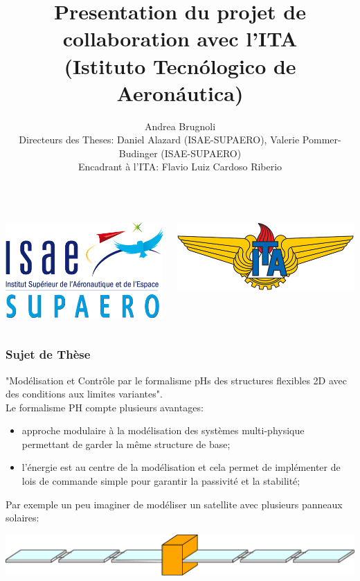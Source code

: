 \documentclass{beamer}
\title[Collaboration avec l'ITA]{Presentation du projet de collaboration avec l'ITA \\ (Istituto Tecn\'ologico de Aeron\'autica)}
\author[A. Brugnoli ISAE-SUPAERO]{\small Andrea Brugnoli \\
 \footnotesize Directeurs des Theses: Daniel Alazard (ISAE-SUPAERO), Valerie Pommer-Budinger (ISAE-SUPAERO) \\
\footnotesize Encadrant à l'ITA: Flavio Luiz Cardoso Riberio}
\begin{document}
	
	
	
\begin{frame}
	\titlepage
\begin{columns}
	\begin{column}{0.5\textwidth}
		\centering
		\includegraphics[height=0.2\textheight]{ISAE-SUPAERO.png}
	\end{column}
	\begin{column}{0.5\textwidth}
		\centering
		\includegraphics[scale=0.3]{ITA_logo.png}
	\end{column}
\end{columns}

\end{frame}

\begin{frame}
\frametitle{Sujet de Thèse}
"Modélisation et Contrôle par le formalisme pHs des structures flexibles 2D avec des conditions aux limites variantes".\\
\vspace{5mm}
Le formalisme PH compte plusieurs avantages:
\begin{itemize}
\item approche modulaire à la modélisation des systèmes multi-physique permettant de garder la même structure de base;
\item l'énergie est au centre de la modélisation et cela permet de implémenter de lois de commande simple pour garantir la passivité et la stabilité;

\end{itemize}
Par exemple un peu imaginer de modéliser un satellite avec plusieurs panneaux solaires:

\includegraphics[width=0.99 \columnwidth]{multiarray.eps}
\end{frame}
\end{document}
